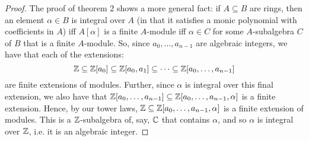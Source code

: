 \begin{proof}
    The proof of theorem 2 shows a more general fact: if $A \subseteq B$ are rings, then an element $\alpha \in B$ is integral over $A$ (in that it satisfies a monic polynomial with coefficients in $A$) iff $A[\alpha]$ is a finite $A$-module iff $\alpha \in C$ for some $A$-subalgebra $C$ of $B$ that is a finite $A$-module. So, since $a_0,\ldots,a_{n-1}$ are algebraic integers, we have that each of the extensions:
    \[ \mathbb{Z} \subseteq \mathbb{Z}[a_0] \subseteq \mathbb{Z}[a_0,a_1] \subseteq \cdots \subseteq \mathbb{Z}[a_0,\ldots,a_{n-1}] \]
    are finite extensions of modules. Further, since $\alpha$ is integral over this final extension, we also have that $\mathbb{Z}[a_0,\ldots,a_{n-1}] \subseteq \mathbb{Z}[a_0,\ldots,a_{n-1},\alpha]$ is a finite extension. Hence, by our tower laws, $\mathbb{Z} \subseteq \mathbb{Z}[a_0,\ldots,a_{n-1},\alpha]$ is a finite extension of modules. This is a $\mathbb{Z}$-subalgebra of, say, $\mathbb{C}$ that contains $\alpha$, and so $\alpha$ is integral over $\mathbb{Z}$, i.e. it is an algebraic integer.
\end{proof}
